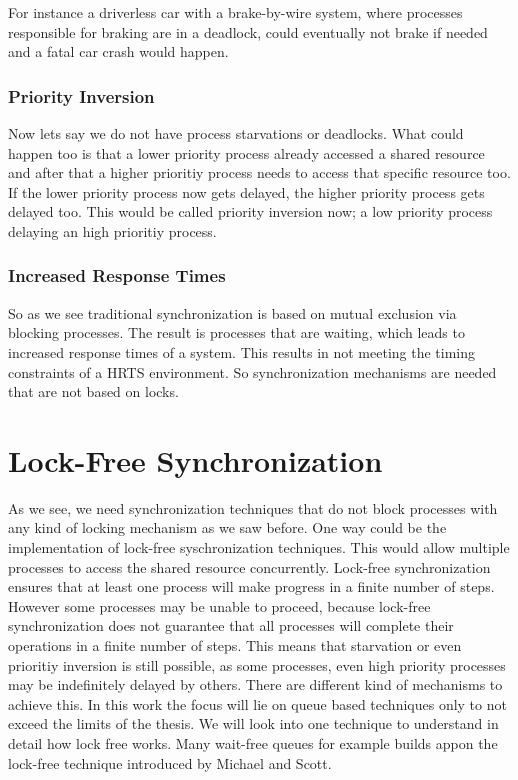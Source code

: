 For instance a driverless car with a brake-by-wire system, where processes responsible for braking are in a deadlock, could eventually not brake if needed and a fatal car crash would happen. 


\subsubsection{Priority Inversion}\label{subsubsec:priority-inversion}

Now lets say we do not have process starvations or deadlocks. What could happen too is that a lower priority process already accessed a shared resource and after that a higher prioritiy process needs to access that specific resource too. If the lower priority process now gets delayed, the higher priority process gets delayed too. This would be called priority inversion now; a low priority process delaying an high prioritiy process. \cite{priorityInversion}

\subsubsection{Increased Response Times}\label{subsubsec:increased-response-times}

So as we see traditional synchronization is based on mutual exclusion via blocking processes. The result is processes that are waiting, which leads to increased response times of a system. This results in not meeting the timing constraints of a \ac{HRTS} environment. So synchronization mechanisms are needed that are not based on locks.

\section{Lock-Free Synchronization}\label{sec:lock-free}

As we see, we need synchronization techniques that do not block processes with any kind of locking mechanism as we saw before. One way could be the implementation of lock-free syschronization techniques. This would allow multiple processes to access the shared resource concurrently. Lock-free synchronization ensures that at least one process will make progress in a finite number of steps. However some processes may be unable to proceed, because lock-free synchronization does not guarantee that all processes will complete their operations in a finite number of steps. This means that starvation or even prioritiy inversion is still possible, as some processes, even high priority processes may be indefinitely delayed by others. There are different kind of mechanisms to achieve this. In this work the focus will lie on queue based techniques only to not exceed the limits of the thesis. We will look into one technique to understand in detail how lock free works. Many wait-free queues for example builds appon the lock-free technique introduced by Michael and Scott. \cite{MichaelScottQueue}

